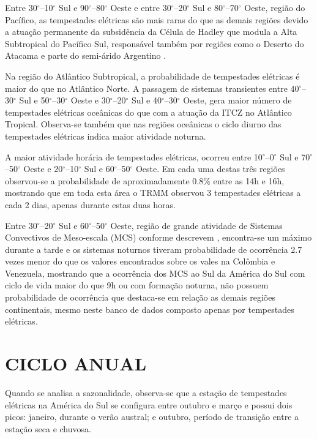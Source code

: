 Entre 30$^{\circ}$--10$^{\circ}$ Sul e 90$^{\circ}$--80$^{\circ}$ Oeste e entre 30$^{\circ}$--20$^{\circ}$ Sul e 80$^{\circ}$--70$^{\circ}$ Oeste, região do Pacífico, as tempestades elétricas são mais raras do que as demais regiões devido a atuação permanente da subsidência da Célula de Hadley que modula a Alta Subtropical do Pacífico Sul, responsável também por regiões como o Deserto do Atacama e parte do semi-árido Argentino \cite{reboita2010regimes}.

Na região do Atlântico Subtropical, a probabilidade de tempestades elétricas é maior do que no Atlântico Norte. A passagem de sistemas transientes entre 40$^{\circ}$--30$^{\circ}$ Sul e 50$^{\circ}$--30$^{\circ}$ Oeste e 30$^{\circ}$--20$^{\circ}$ Sul e 40$^{\circ}$--30$^{\circ}$ Oeste, gera maior número de tempestades elétricas oceânicas do que com a atuação da ITCZ no Atlântico Tropical. Observa-se também que nas regiões oceânicas o ciclo diurno das tempestades elétricas indica maior atividade noturna.


A maior atividade horária de tempestades elétricas, ocorreu entre 10$^{\circ}$--0$^{\circ}$ Sul e 70$^{\circ}$--50$^{\circ}$ Oeste e 20$^{\circ}$--10$^{\circ}$ Sul e 60$^{\circ}$--50$^{\circ}$ Oeste. Em cada uma destas três regiões observou-se a probabilidade de aproximadamente 0.8\% entre as 14h e 16h, mostrando que em toda esta área o TRMM observou 3 tempestades elétricas a cada 2 dias, apenas durante estas duas horas.


Entre 30$^{\circ}$--20$^{\circ}$ Sul e 60$^{\circ}$--50$^{\circ}$ Oeste,  região de grande atividade de Sistemas Convectivos de Meso-escala (MCS) conforme descrevem , encontra-se um máximo durante a tarde e os sistemas noturnos tiveram probabilidade de ocorrência 2.7 vezes menor do que os valores encontrados sobre os vales na Colômbia e Venezuela, mostrando que a ocorrência dos MCS ao Sul da América do Sul com ciclo de vida maior do que 9h ou com formação noturna, não possuem probabilidade de ocorrência que destaca-se em relação as demais regiões continentais, mesmo neste banco de dados composto apenas por tempestades elétricas. 

\section{CICLO ANUAL}
\label{cicloanualsecao}

Quando se analisa a sazonalidade, observa-se que a estação de tempestades elétricas na América do Sul se configura entre outubro e março e possui dois picos: janeiro, durante o verão austral; e outubro, período de transição entre a estação seca e chuvosa. 


